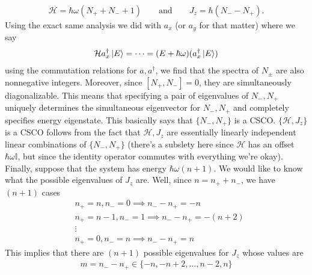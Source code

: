 \documentclass{article}
\theoremstyle{definition}
\newcommand{\ham}{\mathcal{H}}
\begin{document}
\begin{align*}
\ham = \hbar \omega(N_+ + N_- +1) \quad\quad \text{and}\quad\quad J_z = \hbar(N_- - N_+).
\end{align*}
Using the exact same analysis we did with $a_x$ (or $a_y$ for that matter) where we say 
\begin{align*}
\ham a^\dagger_x \ket{E} = \dots = (E+\hbar\omega)(a^\dagger_x \ket{E}) 
\end{align*}
using the commutation relations for $a,a^\dagger$, we find that the spectra of $N_\pm$ are also nonnegative integers. Moreover, since $[N_+, N_-] = 0$, they are simultaneously diagonalizable. This means that specifying a pair of eigenvalues of $N_-,N_+$ uniquely determines the simultaneous eigenvector for $N_-, N_+$ and completely specifies energy eigenstate. This basically says that $\{N_-,N_+\}$ is a CSCO. $\{\ham, J_z\}$ is a CSCO follows from the fact that $\ham, J_z$ are essentially linearly independent linear combinations of $\{N_-,N_+\}$ (there's a subslety here since $\ham$ has an offset $\hbar \omega \mathbb{I}$, but since the identity operator commutes with everything we're okay).\\


Finally, suppose that the system has energy $\hbar \omega(n+1)$. We would like to know what the possible eigenvalues of $J_z$ are. Well, since $n = n_+ + n_-$, we have $(n+1)$ cases
\begin{align*}
&n_+ = n, n_- = 0 \implies n_- - n_+ = -n\\
&n_+ = n-1, n_- = 1 \implies n_- - n_+ = -(n+2)\\
&\vdots \\
&n_+ = 0, n_- = n \implies n_- - n_+ = n
\end{align*}
This implies that there are $(n+1)$ possible eigenvalues for $J_z$ whose values are
\begin{align*}
m = n_- - n_+ \in \{-n, -n+2, \dots, n-2, n\}
\end{align*}
\end{document}
